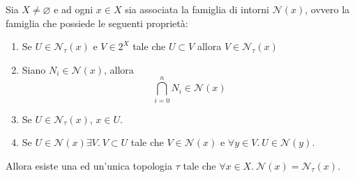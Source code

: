 \begin{proposition}
	Sia $X \neq \varnothing$ e ad ogni $x \in X$ sia associata la famiglia di intorni $\mathcal{N}(x)$, ovvero la famiglia che possiede le seguenti proprietà:
	\begin{enumerate}
		\item Se $U \in \mathcal{N}_\tau(x)$ e $V \in 2^X$ tale che $U \subset V$ allora $V \in \mathcal{N}_\tau(x)$
		\item Siano $N_i \in \mathcal{N}(x)$, allora 
			\begin{equation*}
				\bigcap^{n}_{i=0} N_i \in \mathcal{N}(x)
			\end{equation*}
		\item Se $U \in \mathcal{N}_\tau(x)$, $x \in U$. 
		\item Se $U \in \mathcal{N}(x) \exists V .\ V \subset U$ 
			tale che $V \in \mathcal{N}(x)$ e $\forall y \in V.\ U \in \mathcal{N}(y)$.
	\end{enumerate}
	Allora esiste una ed un'unica topologia $\tau$ tale che $\forall x \in X .\ \mathcal{N}(x) = \mathcal{N}_\tau(x)$.
\end{proposition}
